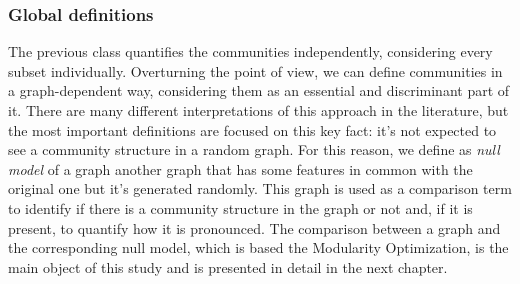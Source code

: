 \subsubsection{Global definitions}
The previous class quantifies the communities independently, considering every subset individually. Overturning the point of view, we can define communities in a graph-dependent way, considering them as an essential and discriminant part of it. There are many different interpretations of this approach in the literature, but the most important definitions are focused on this key fact: it's not expected to see a community structure in a random graph. For this reason, we define as \textit{null model} of a graph another graph that has some features in common with the original one but it's generated randomly. This graph is used as a comparison term to identify if there is a community structure in the graph or not and, if it is present, to quantify how it is pronounced.
The comparison between a graph and the corresponding null model, which is based the Modularity Optimization, is the main object of this study and is presented in detail in the next chapter.
